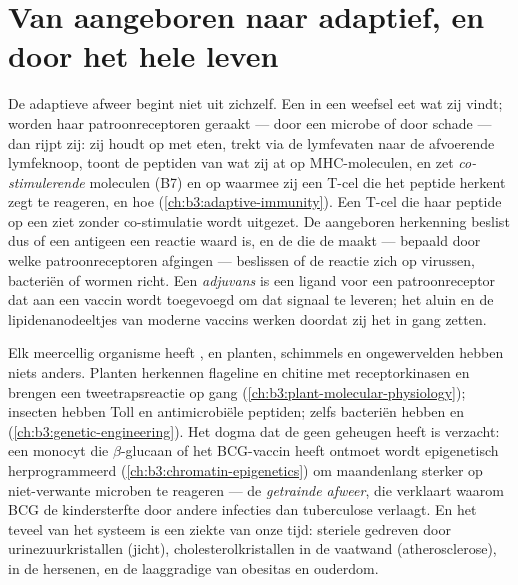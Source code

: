 \section{Van aangeboren naar adaptief, en door het hele leven}

\begin{proposition}\label{prop:b3:innate-immunity:bridge}
De adaptieve afweer begint niet uit zichzelf. Een \emph{} in een weefsel eet wat zij vindt; worden haar patroonreceptoren
geraakt --- door een microbe of door schade --- dan rijpt zij: zij
houdt op met eten, trekt via de lymfevaten naar de afvoerende
lymfeknoop, toont de peptiden van wat zij at op MHC-moleculen, en zet
\emph{co-stimulerende} moleculen (B7) en  op waarmee zij een
T-cel die het peptide herkent zegt te reageren, en hoe
(\cref{ch:b3:adaptive-immunity}). Een T-cel die haar peptide op een
 ziet zonder co-stimulatie wordt uitgezet. De
aangeboren herkenning beslist dus of een antigeen een reactie waard is,
en de  die de  maakt --- bepaald door welke
patroonreceptoren afgingen --- beslissen of de reactie zich op
virussen, bacteriën of wormen richt. Een \emph{adjuvans} is een ligand
voor een patroonreceptor dat aan een vaccin wordt toegevoegd om dat
signaal te leveren; het aluin en de lipidenanodeeltjes van moderne
vaccins werken doordat zij het in gang zetten.
\end{proposition}

\begin{remark}\label{rem:b3:innate-immunity:everywhere}
Elk meercellig organisme heeft , en planten, schimmels
en ongewervelden hebben niets anders. Planten herkennen flageline en
chitine met receptorkinasen en brengen een tweetrapsreactie op gang
(\cref{ch:b3:plant-molecular-physiology}); insecten hebben Toll en
antimicrobiële peptiden; zelfs bacteriën hebben  en
 (\cref{ch:b3:genetic-engineering}). Het dogma dat de  geen geheugen heeft is verzacht: een monocyt die
$\beta$-glucaan of het BCG-vaccin heeft ontmoet wordt epigenetisch
herprogrammeerd (\cref{ch:b3:chromatin-epigenetics}) om maandenlang
sterker op niet-verwante microben te reageren --- de \emph{getrainde
afweer}, die verklaart waarom BCG de kindersterfte door andere
infecties dan tuberculose verlaagt. En het teveel van het systeem is een
ziekte van onze tijd: steriele  gedreven door
urinezuurkristallen (jicht), cholesterolkristallen in de vaatwand
(atherosclerose),  in de hersenen, en de laaggradige 
van obesitas en ouderdom.
\end{remark}

